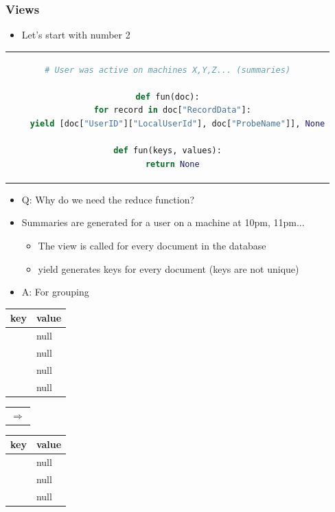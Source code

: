 \documentclass{beamer}
\begin{document}
\begin{frame}[t, fragile]
\frametitle{Views}
\begin{itemize}
\item Let's start with number 2
\end{itemize}
{ \tiny
\begin{center}
\begin{tabular}{c}
\begin{lstlisting}[language=Python]
# User was active on machines X,Y,Z... (summaries)

def fun(doc):
  for record in doc["RecordData"]:
    yield [doc["UserID"]["LocalUserId"], doc["ProbeName"]], None

def fun(keys, values):
  return None

\end{lstlisting}
\end{tabular}
\end{center}
}
\begin{itemize}
 \item Q: Why do we need the reduce function?
 \item Summaries are generated for a user on a machine at 10pm, 11pm...
\begin{itemize}
	\item The view is called for every document in the database
	\item yield generates keys for every document (keys are not unique)
\end{itemize}
 \item A: For grouping
\end{itemize}
{ \tiny
\begin{center}
\begin{tabular}{|l|l|}
	\hline
	\textbf{key} & \textbf{value} \\
	\hline
	\hline
	["root", "spock.cern.ch"] & null \\
	\hline
	["root", "kirk.cern.ch"] & null \\
	\hline
	["root", "spock.cern.ch"] & null \\
	\hline
	["smmsp", "spock.cern.ch"] & null \\
	\hline
\end{tabular}

\begin{tabular}{c}
	$\Longrightarrow$ \\
\end{tabular}
\begin{tabular}{|l|l|}
	\hline
	\textbf{key} & \textbf{value} \\
	\hline
	\hline
	["root", "spock.cern.ch"] & null \\
	\hline
	["root", "kirk.cern.ch"] & null \\
	\hline
	["smmsp", "spock.cern.ch"] & null \\
	\hline
\end{tabular}
\end{center}
}
\end{frame}
\end{document}

